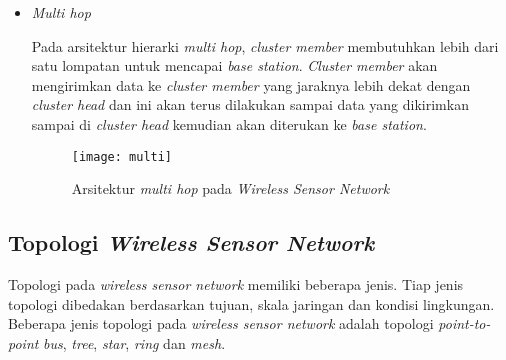 \begin{enumerate}[label=(\roman*)]
\begin{itemize}
		\item \textit{Multi hop}
		
		Pada arsitektur hierarki \textit{multi hop}, \textit{cluster member} membutuhkan lebih dari satu lompatan untuk mencapai \textit{base station}. \textit{Cluster member} akan mengirimkan data ke \textit{cluster member} yang jaraknya lebih dekat dengan \textit{cluster head} dan ini akan terus dilakukan sampai data yang dikirimkan sampai di \textit{cluster head} kemudian akan diterukan ke \textit{base station}.
		
		\begin{figure}[H] 
		\centering  
		\texttt{[image: multi]}  
		\caption[Arsitektur \textit{multi hop} pada \textit{Wireless Sensor Network}]{Arsitektur \textit{multi hop} pada \textit{Wireless Sensor Network}}
		\label{fig:multi} 
	\end{figure}
	\end{itemize}
\end{enumerate}

\subsection{Topologi \textit{Wireless Sensor Network}}
\label{topologi}
Topologi pada \textit{wireless sensor network} memiliki beberapa jenis. Tiap jenis topologi dibedakan berdasarkan tujuan, skala jaringan dan kondisi lingkungan. Beberapa jenis topologi pada \textit{wireless sensor network} adalah topologi \textit{point-to-point} \textit{bus}, \textit{tree}, \textit{star}, \textit{ring} dan \textit{mesh}.

